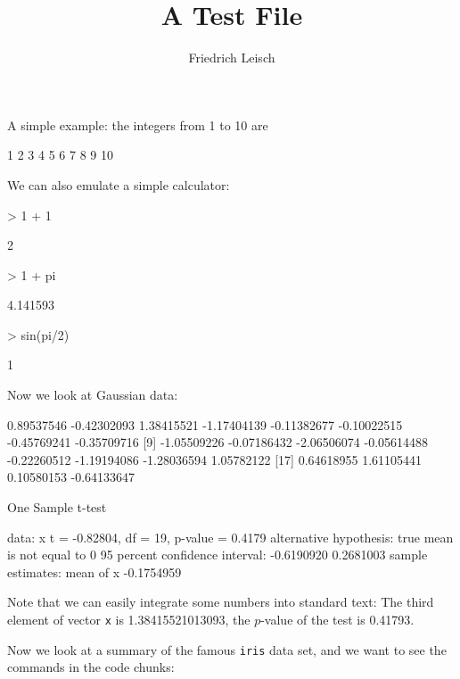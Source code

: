 \documentclass[a4paper]{article}
\title{A Test File}
\author{Friedrich Leisch}
\begin{document}
\maketitle

A simple example: the integers from 1 to 10 are
\begin{Schunk}
\begin{Soutput}
 [1]  1  2  3  4  5  6  7  8  9 10
\end{Soutput}
\end{Schunk}

We can also emulate a simple calculator:
\begin{Schunk}
\begin{Sinput}
> 1 + 1
\end{Sinput}
\begin{Soutput}
[1] 2
\end{Soutput}
\begin{Sinput}
> 1 + pi
\end{Sinput}
\begin{Soutput}
[1] 4.141593
\end{Soutput}
\begin{Sinput}
> sin(pi/2)
\end{Sinput}
\begin{Soutput}
[1] 1
\end{Soutput}
\end{Schunk}

Now we look at Gaussian data:

\begin{Schunk}
\begin{Soutput}
 [1]  0.89537546 -0.42302093  1.38415521 -1.17404139 -0.11382677 -0.10022515 -0.45769241 -0.35709716
 [9] -1.05509226 -0.07186432 -2.06506074 -0.05614488 -0.22260512 -1.19194086 -1.28036594  1.05782122
[17]  0.64618955  1.61105441  0.10580153 -0.64133647
\end{Soutput}
\begin{Soutput}
	One Sample t-test

data:  x
t = -0.82804, df = 19, p-value = 0.4179
alternative hypothesis: true mean is not equal to 0
95 percent confidence interval:
 -0.6190920  0.2681003
sample estimates:
 mean of x 
-0.1754959 
\end{Soutput}
\end{Schunk}
Note that we can easily integrate some numbers into standard text: The
third element of vector \texttt{x} is 1.38415521013093, the
$p$-value of the test is 0.41793. %

Now we look at a summary of the famous \texttt{iris} data set, and we
want to see the commands in the code chunks:
\end{document}
